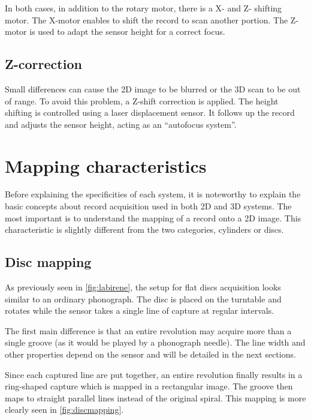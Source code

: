 In both cases, in addition to the rotary motor, there is a X- and Z- shifting motor. The X-motor enables to shift the record to scan another portion. The Z-motor is used to adapt the sensor height for a correct focus.

\subsection{Z-correction}
\label{sec:zcorr}

Small differences can cause the 2D image to be blurred or the 3D scan to be out of range. To avoid this problem, a Z-shift correction is applied. The height shifting is controlled using a laser displacement sensor. It follows up the record and adjusts the sensor height, acting as an ``autofocus system''.

\section{Mapping characteristics}
\label{sec:mapping}

Before explaining the specificities of each system, it is noteworthy to explain the basic concepts about record acquisition used in both 2D and 3D systems. The most important is to understand the mapping of a record onto a 2D image. This characteristic is slightly different from the two categories, cylinders or discs.

\subsection{Disc mapping}
\label{sec:discmap}

As previously seen in \autoref{fig:labirene}, the setup for flat discs acquisition looks similar to an ordinary phonograph. The disc is placed on the turntable and rotates while the sensor takes a single line of capture at regular intervals.

The first main difference is that an entire revolution may acquire more than a single groove (as it would be played by a phonograph needle). The line width and other properties depend on the sensor and will be detailed in the next sections.

Since each captured line are put together, an entire revolution finally results in a ring-shaped capture which is mapped in a rectangular image. The groove then maps to straight parallel lines instead of the original spiral. This mapping is more clearly seen in \autoref{fig:discmapping}.

